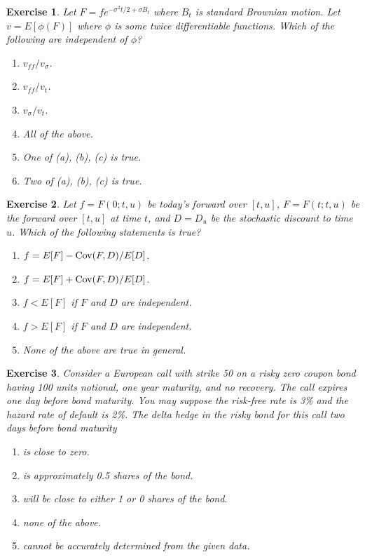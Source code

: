 \documentclass[11pt,fleqn]{amsproc}
\newcommand{\Cov}{\mathop{\rm{Cov}}}
\newtheorem{xca}{Exercise}
\begin{document}
\begin{xca}
Let $F = fe^{-\sigma^2t/2 + \sigma B_t}$ where $B_t$ is standard
Brownian motion. Let $v = E[\phi(F)]$ where $\phi$ is some
twice differentiable functions. Which of the following are
independent of $\phi$?
\begin{enumerate}
\item $v_{ff}/v_\sigma$.
\item $v_{ff}/v_t$.
\item $v_\sigma/v_t$.
\item All of the above.
\item One of (a), (b), (c) is true.
\item Two of (a), (b), (c) is true.
\end{enumerate}
\end{xca}

\begin{xca}
Let $f = F(0;t,u)$ be today's forward over $[t,u]$, $F = F(t;t,u)$ be
the forward over $[t,u]$ at time $t$, and $D = D_u$ be the stochastic
discount to time $u$. Which of the following statements is true?

\begin{enumerate}
\item $f = E[F] - \Cov(F,D)/E[D]$.
\item $f = E[F] + \Cov(F,D)/E[D]$.
\item $f < E[F]$ if $F$ and $D$ are independent.
\item $f > E[F]$ if $F$ and $D$ are independent.
\item None of the above are true in general.
\end{enumerate}

\end{xca}

\begin{xca}
Consider a European call with strike 50 on a risky zero coupon bond having
100 units notional, one year maturity, and no recovery.  The call expires
one day before bond maturity.  You may suppose the risk-free rate is 3\%
and the hazard rate of default is 2\%. The delta hedge in the risky bond
for this call two days before bond maturity 

\begin{enumerate}
\item is close to zero.
\item is approximately 0.5 shares of the bond.
\item will be close to either 1 or 0 shares of the bond.
\item none of the above.
\item cannot be accurately determined from the given data.
\end{enumerate}
\end{xca}
\end{document}
